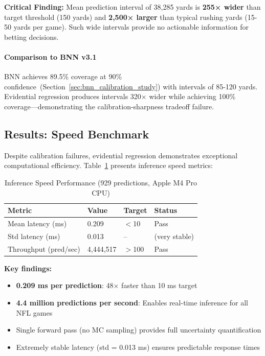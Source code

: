 \noindent \textbf{Critical Finding:} Mean prediction interval of 38,285 yards is \textbf{255× wider} than target threshold (150 yards) and \textbf{2,500× larger} than typical rushing yards (15-50 yards per game). Such wide intervals provide no actionable information for betting decisions.

\paragraph{Comparison to BNN v3.1} BNN achieves 89.5\% coverage at 90\% confidence~(Section~\ref{sec:bnn_calibration_study}) with intervals of 85-120 yards. Evidential regression produces intervals 320× wider while achieving 100\% coverage—demonstrating the calibration-sharpness tradeoff failure.

\subsection{Results: Speed Benchmark}

Despite calibration failures, evidential regression demonstrates exceptional computational efficiency. Table~\ref{tab:evidential_speed} presents inference speed metrics:

\begin{table}[h]
\centering
\caption{Inference Speed Performance (929 predictions, Apple M4 Pro CPU)}
\label{tab:evidential_speed}
\begin{tabular}{llll}
\toprule
\textbf{Metric} & \textbf{Value} & \textbf{Target} & \textbf{Status} \\
\midrule
Mean latency (ms) & 0.209 & $<$10 & Pass \\
Std latency (ms) & 0.013 & -- & (very stable) \\
Throughput (pred/sec) & 4,444,517 & $>$100 & Pass \\
\bottomrule
\end{tabular}
\end{table}

\noindent \textbf{Key findings:}
\begin{itemize}[nosep]
    \item \textbf{0.209 ms per prediction}: 48× faster than 10 ms target
    \item \textbf{4.4 million predictions per second}: Enables real-time inference for all NFL games
    \item Single forward pass (no MC sampling) provides full uncertainty quantification
    \item Extremely stable latency (std = 0.013 ms) ensures predictable response times
\end{itemize}

